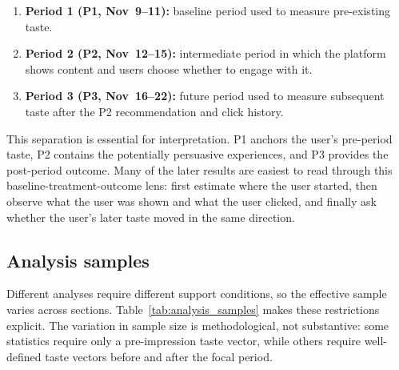 \documentclass[11pt]{article}
\begin{document}
\begin{enumerate}[leftmargin=1.5em, itemsep=0.2em, topsep=0.25em]
    \item \textbf{Period 1 (P1, Nov~9--11):} baseline period used to measure pre-existing taste.
    \item \textbf{Period 2 (P2, Nov~12--15):} intermediate period in which the platform shows content and users choose whether to engage with it.
    \item \textbf{Period 3 (P3, Nov~16--22):} future period used to measure subsequent taste after the P2 recommendation and click history.
\end{enumerate}

This separation is essential for interpretation. P1 anchors the user's pre-period taste, P2 contains the potentially persuasive experiences, and P3 provides the post-period outcome. Many of the later results are easiest to read through this baseline-treatment-outcome lens: first estimate where the user started, then observe what the user was shown and what the user clicked, and finally ask whether the user's later taste moved in the same direction.

\subsection{Analysis samples}

Different analyses require different support conditions, so the effective sample varies across sections. Table~\ref{tab:analysis_samples} makes these restrictions explicit. The variation in sample size is methodological, not substantive: some statistics require only a pre-impression taste vector, while others require well-defined taste vectors before and after the focal period.
\end{document}
